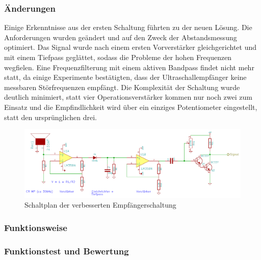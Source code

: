 \subsubsection{Änderungen}
Einige Erkenntnisse aus der ersten Schaltung führten zu der neuen Lösung. Die Anforderungen wurden geändert und auf den Zweck der Abstandsmessung optimiert. Das Signal wurde nach einem ersten Vorverstärker gleichgerichtet und mit einem Tiefpass geglättet, sodass die Probleme der hohen Frequenzen wegfielen. Eine Frequenzfilterung mit einem aktiven Bandpass findet nicht mehr statt, da einige Experimente bestätigten, dass der Ultraschallempfänger keine messbaren Störfrequenzen empfängt. Die Komplexität der Schaltung wurde deutlich minimiert, statt vier Operationsverstärker kommen nur noch zwei zum Einsatz und die Empfindlichkeit wird über ein einziges Potentiometer eingestellt, statt den ursprünglichen drei.

\begin{figure}[H]
\centering
\includegraphics[width=(\textwidth)]{images/empfanger2.png}
\caption{Schaltplan der verbesserten Empfängerschaltung} \label{img:Empf2}
\end{figure}

\subsubsection{Funktionsweise}



\subsubsection{Funktionstest und Bewertung}


